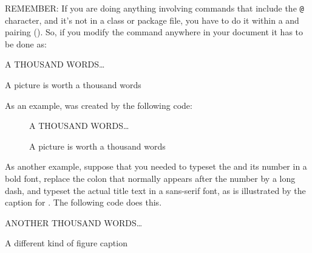  REMEMBER: If you are doing anything involving commands that include
the \idxatincode\texttt{@} character, and it's not in a class or package 
file, you have
to do it within a \cmd{\makeatletter} and \cmd{\makeatother} pairing
(\seeatincode). So,
if you modify the \cmd{\fnum@figure} command anywhere in your document
it has to be done as:
\begin{lcode}
 \makeatletter
 \renewcommand{\fnum@figure}{......}
 \makeatother
\end{lcode}

 \makeatletter
\let\oldfnum@figure\fnum@figure
 \renewcommand{\fnum@figure}{\textsc{\figurename~\thefigure}}
 \makeatother
 \begin{shadefigure}
 \centering
 A THOUSAND WORDS\ldots
 \caption{A picture is worth a thousand words}\label{fig:sc}
 \end{shadefigure}

 As an example,  was created by the following code:
\begin{lcode}
 \makeatletter
 \renewcommand{\fnum@figure}{\textsc{\figurename~\thefigure}}
 \makeatother
 \begin{figure}
 \centering
 A THOUSAND WORDS\ldots
 \caption{A picture is worth a thousand words}\label{fig:sc}
 \end{figure}
\end{lcode}

 As another example, suppose that you needed to typeset the \cmd{\figurename}
and its number in a bold font, replace the 
colon that normally appears
after the number by a long dash, and typeset the actual title 
text in
a sans-serif font, as is illustrated by the caption for 
. The following code does this.

 \makeatletter
 \renewcommand{\fnum@figure}[1]{\textbf{\figurename~\thefigure} --- \sffamily}
 \makeatother
 \begin{shadefigure}
  \centering
  ANOTHER THOUSAND WORDS\ldots
 \caption{A different kind of figure caption}\label{fig:sf}
 \end{shadefigure}

